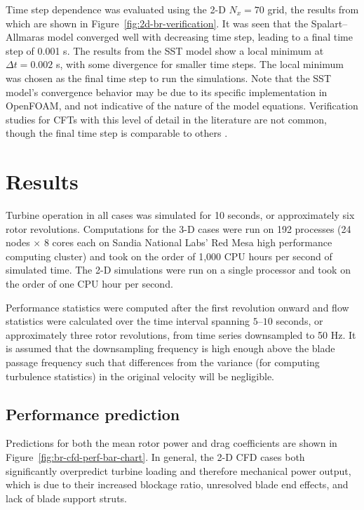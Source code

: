 \documentclass[aip,graphicx]{revtex4-1}
\begin{document}
Time step dependence was evaluated using the 2-D $N_x=70$ grid, the results from
which are shown in Figure~\ref{fig:2d-br-verification}. It was seen that the
Spalart--Allmaras model converged well with decreasing time step, leading to a
final time step of 0.001 s. The results from the SST model show a local minimum
at $\Delta t = 0.002$ s, with some divergence for smaller time steps. The local
minimum was chosen as the final time step to run the simulations. Note that the
SST model's convergence behavior may be due to its specific implementation in
OpenFOAM, and not indicative of the nature of the model equations. Verification
studies for CFTs with this level of detail in the literature are not common,
though the final time step is comparable to others \cite{Balduzzi2016}.


\section{Results}

Turbine operation in all cases was simulated for 10 seconds, or approximately
six rotor revolutions. Computations for the 3-D cases were run on 192 processes
(24 nodes $\times$ 8 cores each on Sandia National Labs' Red Mesa high
performance computing cluster) and took on the order of 1,000 CPU hours per
second of simulated time. The 2-D simulations were run on a single processor and
took on the order of one CPU hour per second.

Performance statistics were computed after the first revolution onward and flow
statistics were calculated over the time interval spanning $5$--$10$ seconds, or
approximately three rotor revolutions, from time series downsampled to 50 Hz. It
is assumed that the downsampling frequency is high enough above the blade
passage frequency such that differences from the variance (for computing
turbulence statistics) in the original velocity will be negligible.


\subsection{Performance prediction}

Predictions for both the mean rotor power and drag coefficients are shown in
Figure~\ref{fig:br-cfd-perf-bar-chart}. In general, the 2-D CFD cases both
significantly overpredict turbine loading and therefore mechanical power output,
which is due to their increased blockage ratio, unresolved blade end effects,
and lack of blade support struts.
\end{document}
